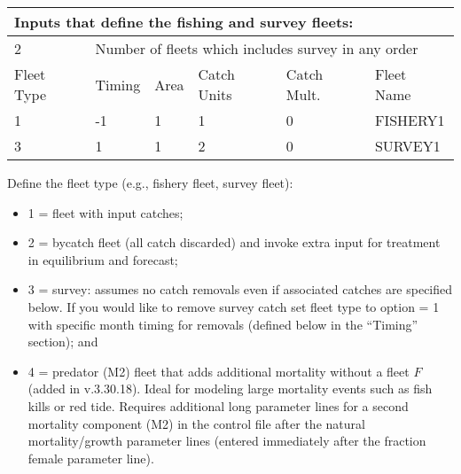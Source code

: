 \begin{center}
	\begin{tabular}{p{2cm} p{2cm} p{2cm} p{2cm} p{2cm} p{4cm}}
		\multicolumn{6}{l}{Inputs that define the fishing and survey fleets:} \\
		\hline
		2 & \multicolumn{5}{l}{Number of fleets which includes survey in any order} \Tstrut\Bstrut\\

		\hline
		Fleet Type & Timing & Area & Catch Units & Catch Mult. & Fleet Name \Tstrut\Bstrut\\

		\hline
		1 & -1 & 1 & 1 & 0 & FISHERY1 \Tstrut\\
		3 &  1 & 1 & 2 & 0 & SURVEY1 \Bstrut\\
		\hline	
	\end{tabular}
\end{center}

Define the fleet type (e.g., fishery fleet, survey fleet):
\begin{itemize}
	\item 1 = fleet with input catches;
 	\item 2 = bycatch fleet (all catch discarded) and invoke extra input for treatment in equilibrium and forecast;
  	\item 3 = survey: assumes no catch removals even if associated catches are specified below. If you would like to remove survey catch set fleet type to option = 1 with specific month timing for removals (defined below in the ``Timing'' section); and 
 	\item 4 = predator (M2) fleet that adds additional mortality without a fleet $F$ (added in v.3.30.18). Ideal for modeling large mortality events such as fish kills or red tide. Requires additional long parameter lines for a second mortality component (M2) in the control file after the natural mortality/growth parameter lines (entered immediately after the fraction female parameter line).
\end{itemize}

